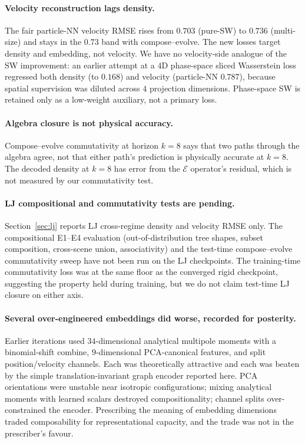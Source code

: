 \documentclass[11pt]{article}
\newcommand{\evolve}{\mathcal{E}}
\begin{document}
\paragraph{Velocity reconstruction lags density.} The fair particle-NN velocity RMSE rises from $0.703$ (pure-SW) to $0.736$ (multi-size) and stays in the $0.73$ band with compose--evolve. The new losses target density and embedding, not velocity. We have no velocity-side analogue of the SW improvement: an earlier attempt at a $4$D phase-space sliced Wasserstein loss regressed both density (to $0.168$) and velocity (particle-NN $0.787$), because spatial supervision was diluted across $4$ projection dimensions. Phase-space SW is retained only as a low-weight auxiliary, not a primary loss.

\paragraph{Algebra closure is not physical accuracy.} Compose--evolve commutativity at horizon $k = 8$ says that two paths through the algebra agree, not that either path's prediction is physically accurate at $k = 8$. The decoded density at $k = 8$ has error from the $\evolve$ operator's residual, which is not measured by our commutativity test.

\paragraph{LJ compositional and commutativity tests are pending.} Section~\ref{sec:lj} reports LJ cross-regime density and velocity RMSE only. The compositional E1--E4 evaluation (out-of-distribution tree shapes, subset composition, cross-scene union, associativity) and the test-time compose--evolve commutativity sweep have not been run on the LJ checkpoints. The training-time commutativity loss was at the same floor as the converged rigid checkpoint, suggesting the property held during training, but we do not claim test-time LJ closure on either axis.

\paragraph{Several over-engineered embeddings did worse, recorded for posterity.} Earlier iterations used $34$-dimensional analytical multipole moments with a binomial-shift combine, $9$-dimensional PCA-canonical features, and split position/velocity channels. Each was theoretically attractive and each was beaten by the simple translation-invariant graph encoder reported here. PCA orientations were unstable near isotropic configurations; mixing analytical moments with learned scalars destroyed compositionality; channel splits over-constrained the encoder. Prescribing the meaning of embedding dimensions traded composability for representational capacity, and the trade was not in the prescriber's favour.
\end{document}
